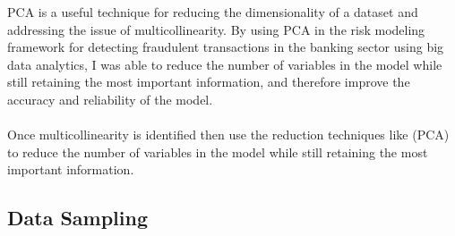 PCA is a useful technique for reducing the dimensionality of a dataset and addressing the issue of 
multicollinearity. By using PCA in the risk modeling framework for detecting fraudulent transactions in the 
banking sector using big data analytics, I was able to reduce the number of variables in the model while still 
retaining the most important information, and therefore improve the accuracy and reliability of the model.\\\\
Once multicollinearity is identified then use the reduction 
techniques like (PCA) to reduce the number of variables in the model while still 
retaining the most important information.

\subsection{Data Sampling}

